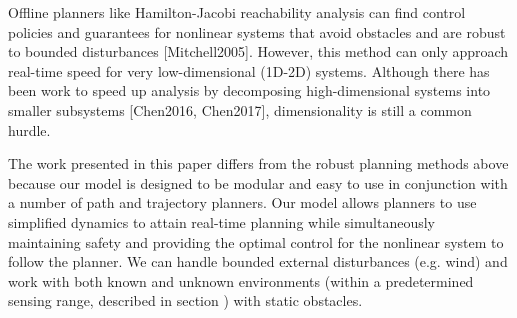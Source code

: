 Offline planners like Hamilton-Jacobi reachability analysis can find control policies and guarantees for nonlinear systems that avoid obstacles and are robust to bounded disturbances [Mitchell2005].  However, this method can only approach real-time speed for very low-dimensional (1D-2D) systems. Although there has been work to speed up analysis by decomposing high-dimensional systems into smaller subsystems [Chen2016, Chen2017], dimensionality is still a common hurdle.

The work presented in this paper differs from the robust planning methods above because our model is designed to be modular and easy to use in conjunction with a number of path and trajectory planners.  Our model allows planners to use simplified dynamics to attain real-time planning while simultaneously maintaining safety and providing the optimal control for the nonlinear system to follow the planner. We can handle bounded external disturbances (e.g. wind) and work with both known and unknown environments (within a predetermined sensing range, described in section ) with static obstacles. 

